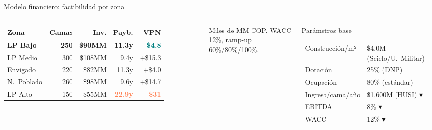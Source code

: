 \documentclass[aspectratio=169, 11pt]{beamer}
\newcommand{\highlight}[1]{\textcolor{teal}{\textbf{#1}}}
\newcommand{\danger}[1]{\textcolor{coral}{\textbf{#1}}}
\begin{document}
\begin{frame}{Modelo financiero: factibilidad por zona}

\begin{columns}[T]
{\scriptsize
\begin{tabular}{@{}l r r r r@{}}
\toprule
\textbf{Zona} & \textbf{Camas} & \textbf{Inv.} & \textbf{Payb.} & \textbf{VPN} \\
\midrule
\rowcolor{teal!10}
\textbf{LP Bajo} & \textbf{250} & \textbf{\$90MM} & \textbf{11.3y} & \highlight{+\$4.8} \\
LP Medio & 300 & \$108MM & 9.4y & +\$15.3 \\
Envigado & 220 & \$82MM & 11.3y & +\$4.0 \\
N.\ Poblado & 260 & \$98MM & 9.6y & +\$14.7 \\
\rowcolor{coral!8}
LP Alto & 150 & \$55MM & \danger{22.9y} & \danger{--\$31} \\
\bottomrule
\end{tabular}
}
{\tiny Miles de MM COP. WACC 12\%, ramp-up 60\%/80\%/100\%.}

\vspace{4pt}

\begin{block}{\small Parámetros base}
\tiny
\begin{tabular}{@{}ll@{}}
Construcción/m² & \$4.0M (Scielo/U.\ Militar) \\
Dotación & 25\% (DNP) \\
Ocupación & 80\% (estándar) \\
Ingreso/cama/año & \$1,600M (HUSI) {\color{coral}$\blacktriangledown$} \\
EBITDA & 8\% {\color{coral}$\blacktriangledown$} \\
WACC & 12\% {\color{coral}$\blacktriangledown$} \\
\end{tabular}
\end{block}


\end{columns}
\end{frame}
\end{document}
